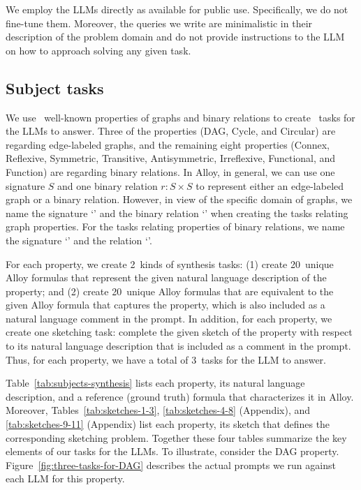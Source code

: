 We employ the LLMs directly as available for public use.  Specifically, we do not fine-tune them.  Moreover, the queries we write are minimalistic in their description of the problem domain and do not provide instructions to the LLM on how to approach solving any given task.

\subsection{Subject tasks}

We use \NumSubjects~well-known properties of graphs and binary relations to create \NumTotalTasks~tasks for the LLMs to answer.  Three of the properties (DAG, Cycle, and Circular) are regarding edge-labeled graphs, and the remaining eight properties (Connex, Reflexive, Symmetric, Transitive, Antisymmetric, Irreflexive, Functional, and Function) are regarding binary relations.  In Alloy, in general, we can use one signature $S$ and one binary relation $r: S\times S$ to represent either an edge-labeled graph or a binary relation. However, in view of the specific domain of graphs, we name the signature `' and the binary relation `' when creating the tasks relating graph properties. For the tasks relating properties of binary relations, we name the signature `' and the relation `'.

For each property, we create 2~kinds of synthesis tasks: (1) create 20~unique Alloy formulas that represent the given natural language description of the property; and (2) create 20~unique Alloy formulas that are equivalent to the given Alloy formula that captures the property, which is also included as a natural language comment in the prompt.  In addition, for each property, we create one sketching task: complete the given sketch of the property with respect to its natural language description that is included as a comment in the prompt.  Thus, for each property, we have a total of 3~tasks for the LLM to answer.

Table~\ref{tab:subjects-synthesis} lists each property, its natural language description, and a reference (ground truth) formula that characterizes it in Alloy. Moreover, Tables~\ref{tab:sketches-1-3}, \ref{tab:sketches-4-8} (Appendix), and \ref{tab:sketches-9-11} (Appendix) list each property, its sketch that defines the corresponding sketching problem. Together these four tables summarize the key elements of our tasks for the LLMs. To illustrate, consider the DAG property.  Figure~\ref{fig:three-tasks-for-DAG} describes the actual prompts we run against each LLM for this property.

